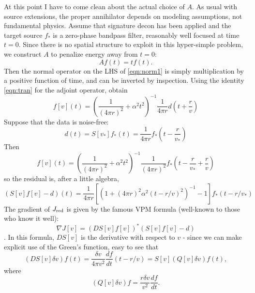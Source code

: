 At this point I have to come clean about the actual choice of $A$. As usual with source extensions, the proper annihilator depends on modeling assumptions, not fundamental physics. Assume that signature decon has been applied and the target source $f_*$ is a zero-phase bandpass filter, reasonably well focused at time $t=0$. Since there is no spatial structure to exploit in this hyper-simple problem, we construct $A$ to penalize energy away from $t=0$:
\begin{equation}
\label{eqn:ann}
Af(t) = tf(t).
\end{equation}
Then the normal operator on the LHS of \ref{eqn:norm1} is simply multiplication by a positive function of time, and can be inverted by inspection. Using the identity \ref{eqn:tran} for the adjoint operator, obtain
\begin{equation}
\label{eqn:soln} 
f[v](t) = \left(\frac{1}{(4\pi r)^2} + \alpha^2 t^2\right)^{-1}\frac{1}{4\pi r}d\left(t+\frac{r}{v}\right)  
\end{equation} 
Suppose that the data is noise-free: 
\begin{equation}
\label{eqn:nonoise}
d(t) = S[v_*]f_*(t) = \frac{1}{4\pi r}f_*\left(t-\frac{r}{v_*}\right)
\end{equation}
Then
\begin{equation}
\label{eqn:solnnon}
f[v](t) = \left(\frac{1}{(4\pi r)^2} + \alpha^2 t^2\right)^{-1}\frac{1}{(4\pi r)^2}f_*\left(t-\frac{r}{v_*}+\frac{r}{v}\right) 
\end{equation}
so the residual is, after a little algebra,
\begin{equation}
\label{eqn:resid}
(S[v]f[v]-d)(t) =\frac{1}{4\pi r}[ (1+(4\pi r)^2 \alpha^2 (t-r/v)^2)^{-1} - 1]f_*(t-r/v_*)
\end{equation}
The gradient of $J_{\rm red}$ is given by the famous VPM formula (well-known to those who know it well):
\begin{equation}
\label{eqn:grad}
\nabla J[v] = (DS[v]f[v])^*(S[v]f[v]-d)
\end{equation}.
In this formula, $DS[v]$ is the derivative with respect to $v$ - since we can make explicit use of the Green's function, easy to see that
\begin{equation}
\label{eqn:deriv}
(DS[v]\delta v)f (t) = \frac{\delta v}{4\pi v^2}\frac{df}{dt}(t-r/v) = S[v](Q[v]\delta v)f (t),
\end{equation}
where 
\begin{equation}
\label{eqn:defq}
(Q[v]\delta v)f = \frac{r \delta v}{v^2} \frac{df}{dt}.
\end{equation}
